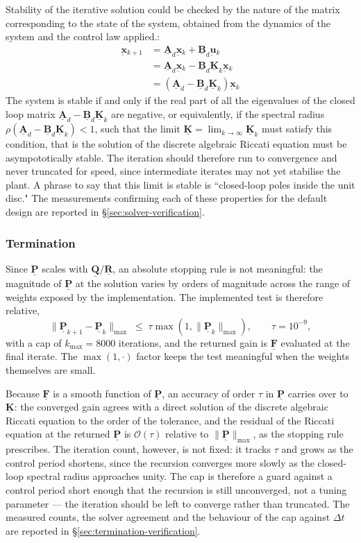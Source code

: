 \documentclass[12pt]{article}
\newcommand{\vb}[1]{{\underset{\tilde{}}{\mathbf{#1}}}}
\newcommand{\mb}[1]{\underline{\mathbf{#1}}}
\begin{document}
Stability of the iterative solution could be checked by the nature of the matrix corresponding to the state of the system, obtained from the dynamics of the system and the control law applied.:
\begin{align*}
    \vb{x}{}_{k+1} &= \mb{A}_d\vb{x}{}_k + \mb{B}_d\vb{u}{}_k \\
    &= \mb{A}_d\vb{x}{}_k - \mb{B}_d\mb{K}_k\vb{x}{}_k \\
    &= (\mb{A}_d - \mb{B}_d\mb{K}_k)\vb{x}{}_k
\end{align*}
The system is stable if and only if the real part of all the eigenvalues of the closed loop matrix $\mb{A}_d - \mb{B}_d\mb{K}_k$ are negative, or equivalently, if the spectral radius $\rho(\mb{A}_d - \mb{B}_d\mb{K}_k) < 1$, such that the limit $\mb{K} = \lim_{k\to\infty} \mb{K}_k$ must satisfy this condition, that is the solution of the discrete algebraic Riccati equation must be asympototically stable. The iteration should therefore run to convergence and never truncated for speed, since intermediate iterates may not yet stabilise the plant. A phrase to say that this limit is stable is ``closed-loop poles inside the unit disc." The measurements confirming each of these properties for the default design are reported in \S\ref{sec:solver-verification}.


\subsubsection{Termination}
\label{sec:termination}

Since $\mb{P}$ scales with $\mb{Q}/\mb{R}$, an absolute stopping rule is not meaningful: the magnitude of $\mb{P}$ at the solution varies by orders of magnitude across the range of weights exposed by the implementation. The implemented test is therefore relative,
\[
\|\mb{P}_{k+1} - \mb{P}_k\|_{\max} \;\leq\; \tau \max\left(1, \|\mb{P}_k\|_{\max}\right), \qquad \tau = 10^{-9},
\]
with a cap of $k_{\max} = 8000$ iterations, and the returned gain is $\mb{F}$ evaluated at the final iterate. The $\max(1, \cdot)$ factor keeps the test meaningful when the weights themselves are small.

Because $\mb{F}$ is a smooth function of $\mb{P}$, an accuracy of order $\tau$ in $\mb{P}$ carries over to $\mb{K}$: the converged gain agrees with a direct solution of the discrete algebraic Riccati equation \cite{Laub1979} to the order of the tolerance, and the residual of the Riccati equation at the returned $\mb{P}$ is $\mathcal{O}(\tau)$ relative to $\|\mb{P}\|_{\max}$, as the stopping rule prescribes. The iteration count, however, is not fixed: it tracks $\tau$ and grows as the control period shortens, since the recursion converges more slowly as the closed-loop spectral radius approaches unity. The cap is therefore a guard against a control period short enough that the recursion is still unconverged, not a tuning parameter --- the iteration should be left to converge rather than truncated. The measured counts, the solver agreement and the behaviour of the cap against $\Delta t$ are reported in \S\ref{sec:termination-verification}.
\end{document}
